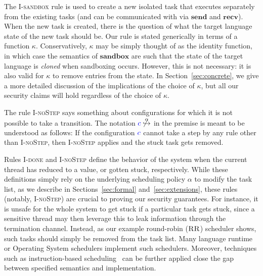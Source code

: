 \documentclass{llncs}
\begin{document}
The \textsc{I-sandbox} rule is used to create a new isolated task that
executes separately from the existing tasks (and can be communicated
with via \ensuremath{\mathbf{send}} and \ensuremath{\mathbf{recv}}).  When the new task is created, there
is the question of what the target language state of the new task should
be.  Our rule is stated generically in terms of a function \ensuremath{\kappa}.
Conservatively, \ensuremath{\kappa} may be simply thought of as the identity
function, in which
case the semantics of \ensuremath{\mathbf{sandbox}} are such that the state of the target language is \emph{cloned}
when sandboxing occurs.  However, this is not necessary: it is also valid for \ensuremath{\kappa}
to remove entries from the state.  In Section~\ref{sec:concrete}, we give a more detailed
discussion of the implications of the choice of \ensuremath{\kappa}, but all our
security claims will hold regardless of the choice of \ensuremath{\kappa}.

The rule \textsc{I-noStep} says something about configurations for which
it is not possible to take a transition.  The notation
${\color{blue} c}\not\overset{\alpha}{\hookrightarrow}$ in the premise
is meant to be understood as
follows:  If the configuration \ensuremath{\ifc{c}} cannot take a step by any rule other
than \textsc{I-noStep}, then \textsc{I-noStep} applies and the
stuck task gets removed.

Rules \textsc{I-done} and \textsc{I-noStep} define the behavior of the system
when the current thread has reduced to a value, or gotten stuck, respectively.
While these definitions simply rely on the underlying scheduling policy
\ensuremath{\alpha} to modify the task list, as we describe in Sections~\ref{sec:formal}
and~\ref{sec:extensions}, these rules (notably, \textsc{I-noStep}) are crucial
to proving our security guarantees.
For instance, it is unsafe for the whole system to get stuck if a particular
task gets stuck, since a sensitive thread may then leverage this to leak
information through the termination channel.
Instead, as our example round-robin (\ensuremath{\textsc{RR}}) scheduler shows,
such tasks should simply be removed from the task list.
Many language runtime or Operating System schedulers implement such
schedulers.
Moreover, techniques such as instruction-based
scheduling~\cite{stefan:2013:eliminating, buiras:2013:a-library} can
be further applied close the gap between specified semantics and
implementation.
\end{document}
